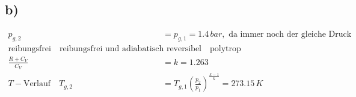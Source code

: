 

\subsection*{b)}
\begin{align*}
p_{g,2} &= p_{g,1} = 1.4 \, bar, \text{ da immer noch der gleiche Druck durch Atmosphäre und Gewicht wirkt.} \\
\text{reibungsfrei} \quad \text{reibungsfrei und adiabatisch reversibel} \quad \text{polytrop} \\
\frac{R + C_V}{C_V} &= k = 1.263 \\
T-\text{Verlauf} \quad T_{g,2} &= T_{g,1} \left( \frac{p_2}{p_1} \right)^{\frac{k-1}{k}} = 273.15 \, K
\end{align*}